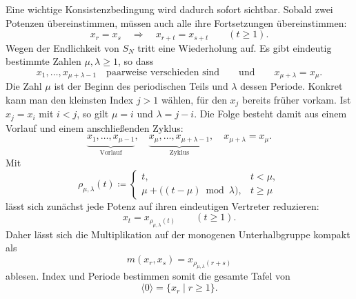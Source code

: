 \documentclass[main.tex]{subfiles}
\begin{document}
Eine wichtige Konsistenzbedingung wird dadurch sofort sichtbar.  Sobald
zwei Potenzen übereinstimmen, müssen auch alle ihre Fortsetzungen
übereinstimmen:
\[
  x_r=x_s
  \quad\Longrightarrow\quad
  x_{r+t}=x_{s+t}
  \qquad(t\geq1).
\]
Wegen der Endlichkeit von \(S_N\) tritt eine Wiederholung auf.  Es gibt
eindeutig bestimmte Zahlen \(\mu,\lambda\geq1\), so dass
\[
  x_1,\ldots,x_{\mu+\lambda-1}
  \quad\text{paarweise verschieden sind}
  \qquad\text{und}\qquad
  x_{\mu+\lambda}=x_\mu.
\]
Die Zahl \(\mu\) ist der Beginn des periodischen Teils und \(\lambda\) dessen
Periode.  Konkret kann man den kleinsten Index \(j>1\) wählen, für den
\(x_j\) bereits früher vorkam.  Ist \(x_j=x_i\) mit \(i<j\), so gilt
\(\mu=i\) und \(\lambda=j-i\).  Die Folge besteht damit aus einem Vorlauf
und einem anschließenden Zyklus:
\[
  \underbrace{x_1,\ldots,x_{\mu-1}}_{\text{Vorlauf}},
  \quad
  \underbrace{x_\mu,\ldots,x_{\mu+\lambda-1}}_{\text{Zyklus}},
  \quad
  x_{\mu+\lambda}=x_\mu.
\]
Mit
\[
  \rho_{\mu,\lambda}(t)
  \coloneqq
  \begin{cases}
    t,&t<\mu,\\
    \mu+\bigl((t-\mu)\bmod\lambda\bigr),&t\geq\mu
  \end{cases}
\]
lässt sich zunächst jede Potenz auf ihren eindeutigen Vertreter reduzieren:
\[
  \boxed{x_t=x_{\rho_{\mu,\lambda}(t)}}\qquad(t\geq1).
\]
Daher lässt sich die Multiplikation auf der monogenen Unterhalbgruppe kompakt als
\[
  \boxed{
    m(x_r,x_s)=x_{\rho_{\mu,\lambda}(r+s)}
  }
\]
ablesen.  Index und Periode bestimmen somit die gesamte Tafel von
\[
  \langle0\rangle=\{x_r\mid r\geq1\}.
\]
\end{document}
